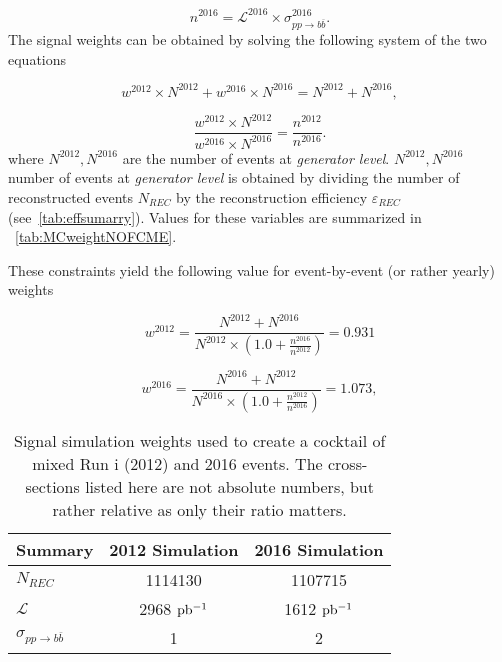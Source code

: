 \begin{equation}
n^{2016}=\mathcal{L}^{2016} \times \sigma^{2016}_{pp \rightarrow b \overline{b}}.
\end{equation}
The signal weights can be obtained by solving the following system of the two equations

\begin{equation}
w^{2012} \times N^{2012} + w^{2016} \times N^{2016} = N^{2012} + N^{2016},
\end{equation}

\begin{equation}
\frac{w^{2012} \times N^{2012}}{w^{2016} \times N^{2016}} = \frac{n^{2012}}{n^{2016}}.
\end{equation}
where $N^{2012},N^{2016}$ are the number of events at \textit{generator level}. $N^{2012},N^{2016}$ number of events at \textit{generator level} is obtained by dividing the number of reconstructed events $N_{REC}$ by the reconstruction efficiency $\varepsilon_{REC}$ (see~\autoref{tab:effsumarry}). Values for these variables are summarized in ~\autoref{tab:MCweightNOFCME}.

These constraints yield the following value for event-by-event (or rather yearly) weights


\begin{equation}
w^{2012}= \frac{N^{2012}+N^{2016}}{N^{2012}\times(1.0+\frac{n^{2016}}{n^{2012}})}=0.931
\end{equation}


\begin{equation}
w^{2016}= \frac{N^{2016}+N^{2012}}{N^{2016}\times(1.0+ \frac{n^{2012}}{n^{2016}})}=1.073,
\end{equation}





\begin{table}[h]
\centering
\begin{tabular}{ l  c  c }
\toprule
Summary & 2012 Simulation & 2016 Simulation \\
\midrule


$N_{REC}$  & 1114130 & 1107715 \\
$\mathcal{L}$ & 2968 $\rm{pb^{-1}}$ & 1612 $\rm{pb^{-1}}$ \\
$\sigma_{pp \rightarrow b \overline{b}}$ & 1 & 2  \\
\bottomrule
\end{tabular}
	\caption{Signal simulation weights used to create a cocktail of mixed Run \Rn{1} (2012) and 2016 events. The cross-sections listed here are not absolute numbers, but rather relative as only their ratio matters.}
\label{tab:MCweightNOFCME}
\end{table}

